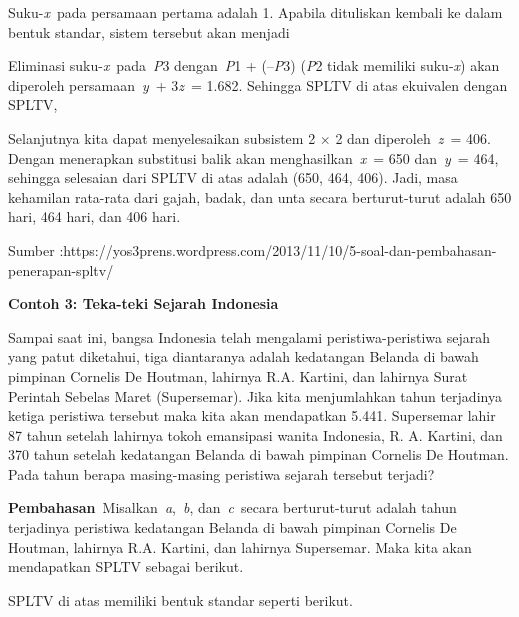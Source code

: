 \documentclass[11pt,fleqn]{book} %
\begin{document}
\noindent Suku-\textit{x}~pada persamaan pertama adalah 1. Apabila dituliskan kembali ke dalam bentuk standar, sistem tersebut akan menjadi

\noindent 

\noindent 

\noindent Eliminasi suku-\textit{x}~pada~\textit{P}3 dengan~\textit{P}1 + (--\textit{P}3) (\textit{P}2 tidak memiliki suku-\textit{x}) akan diperoleh persamaan~\textit{y}~+ 3\textit{z}~= 1.682. Sehingga SPLTV di atas ekuivalen dengan SPLTV,

\noindent 

\noindent 

\noindent Selanjutnya kita dapat menyelesaikan subsistem 2 $\times$ 2 dan diperoleh~\textit{z}~= 406. Dengan menerapkan substitusi balik akan menghasilkan~\textit{x}~= 650 dan~\textit{y}~= 464, sehingga selesaian dari SPLTV di atas adalah (650, 464, 406). Jadi, masa kehamilan rata-rata dari gajah, badak, dan unta secara berturut-turut adalah 650 hari, 464 hari, dan 406 hari.

\noindent Sumber :https://yos3prens.wordpress.com/2013/11/10/5-soal-dan-pembahasan-penerapan-spltv/

\noindent 

\noindent \textbf{Contoh 3: Teka-teki Sejarah Indonesia}

\noindent Sampai saat ini, bangsa Indonesia telah mengalami peristiwa-peristiwa sejarah yang patut diketahui, tiga diantaranya adalah kedatangan Belanda di bawah pimpinan Cornelis De Houtman, lahirnya R.A. Kartini, dan lahirnya Surat Perintah Sebelas Maret (Supersemar). Jika kita menjumlahkan tahun terjadinya ketiga peristiwa tersebut maka kita akan mendapatkan 5.441. Supersemar lahir 87 tahun setelah lahirnya tokoh emansipasi wanita Indonesia, R. A. Kartini, dan 370 tahun setelah kedatangan Belanda di bawah pimpinan Cornelis De Houtman. Pada tahun berapa masing-masing peristiwa sejarah tersebut terjadi?

\noindent 

\noindent \textbf{Pembahasan}~Misalkan~\textit{a},~\textit{b}, dan~\textit{c}~secara berturut-turut adalah tahun terjadinya peristiwa kedatangan Belanda di bawah pimpinan Cornelis De Houtman, lahirnya R.A. Kartini, dan lahirnya Supersemar. Maka kita akan mendapatkan SPLTV sebagai berikut.

\noindent 

\noindent 

\noindent SPLTV di atas memiliki bentuk standar seperti berikut.
\end{document}
